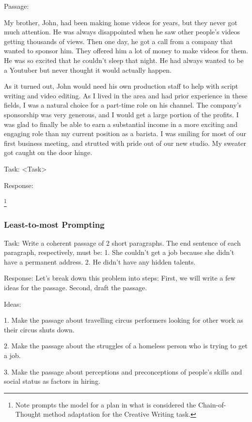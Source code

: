 \documentclass[11pt]{article}
\begin{document}
Passage:

My brother, John, had been making home videos for years, but they never got much attention. He was always disappointed when he saw other people's videos getting thousands of views. Then one day, he got a call from a company that wanted to sponsor him. They offered him a lot of money to make videos for them. He was so excited that he couldn't sleep that night. He had always wanted to be a Youtuber but never thought it would actually happen.

As it turned out, John would need his own production staff to help with script writing and video editing. As I lived in the area and had prior experience in these fields, I was a natural choice for a part-time role on his channel. The company's sponsorship was very generous, and I would get a large portion of the profits. I was glad to finally be able to earn a substantial income in a more exciting and engaging role than my current position as a barista. I was smiling for most of our first business meeting, and strutted with pride out of our new studio. My sweater got caught on the door hinge.

Task: <Task>

Response:

\footnote{Note \citealp{yao_tree_2023} prompts the model for a plan in what is considered the Chain-of-Thought method adaptation for the Creative Writing task.}

\subsubsection*{Least-to-most Prompting}

Task: Write a coherent passage of 2 short paragraphs. The end sentence of each paragraph, respectively, must be: 1. She couldn't get a job because she didn't have a permanent address. 2. He didn't have any hidden talents.

Response: Let's break down this problem into steps: First, we will write a few ideas for the passage. Second, draft the passage.

Ideas:

1. Make the passage about travelling circus performers looking for other work as their circus shuts down.

2. Make the passage about the struggles of a homeless person who is trying to get a job. 

3. Make the passage about perceptions and preconceptions of people's skills and social status as factors in hiring.
\end{document}
